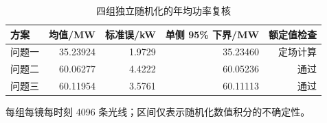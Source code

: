 \begin{table}[htbp]
\centering\small
\caption{四组独立随机化的年均功率复核}\label{tab:uncertainty}
\begin{tabular}{lrrrr}
\toprule
方案 & 均值/MW & 标准误/kW & 单侧 95\% 下界/MW & 额定值检查\\\midrule
问题一 & 35.23924 & 1.9729 & 35.23460 & 定场计算\\
问题二 & 60.06277 & 4.4222 & 60.05236 & 通过\\
问题三 & 60.11954 & 3.5761 & 60.11113 & 通过\\
\bottomrule
\end{tabular}
\par\vspace{3pt}\begin{minipage}{.95\linewidth}\footnotesize 每组每镜每时刻 4096 条光线；区间仅表示随机化数值积分的不确定性。\end{minipage}
\end{table}
